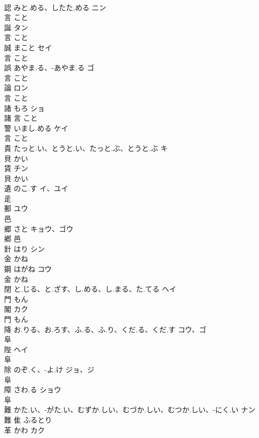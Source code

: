 \documentclass[8pt]{extreport}
\begin{document}
\begin{CJK}{UTF8}{min}
\\	認	みと.める、したた.める	ニン	
\\	言		こと		
\\	誕		タン	
\\	言		こと		
\\	誠	まこと	セイ	
\\	言		こと		
\\	誤	あやま.る、-あやま.る	ゴ	
\\	言		こと		
\\	論		ロン	
\\	言		こと		
\\	諸	もろ	ショ	
\\	諸	言		こと		
\\	警	いまし.める	ケイ	
\\	言		こと		
\\	貴	たっと.い、とうと.い、たっと.ぶ、とうと.ぶ	キ	
\\	貝		かい		
\\	賃		チン	
\\	貝		かい		
\\	遺	のこ.す	イ、ユイ	
\\	辵				
\\	郵		ユウ	
\\	邑				
\\	郷	さと	キョウ、ゴウ	
\\	鄕	邑				
\\	針	はり	シン	
\\	金		かね		
\\	鋼	はがね	コウ	
\\	金		かね		
\\	閉	と.じる、と.ざす、し.める、し.まる、た.てる	ヘイ	
\\	門		もん		
\\	閣		カク	
\\	門		もん		
\\	降	お.りる、お.ろす、ふ.る、ふ.り、くだ.る、くだ.す	コウ、ゴ	
\\	阜				
\\	陛		ヘイ	
\\	阜				
\\	除	のぞ.く、-よ.け	ジョ、ジ	
\\	阜				
\\	障	さわ.る	ショウ	
\\	阜				
\\	難	かた.い、-がた.い、むずか.しい、むづか.しい、むつか.しい、-にく.い	ナン	
\\	難	隹		ふるとり		
\\	革	かわ	カク	

\end{CJK}
\end{document}
